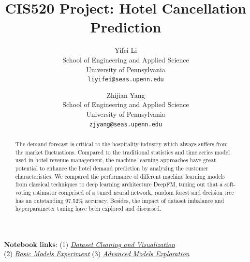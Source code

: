 \documentclass[10pt,twocolumn,letterpaper]{article}
\begin{document}
\title{CIS520 Project: Hotel Cancellation Prediction}
\author{Yifei Li\\
School of Engineering and Applied Science\\
University of Pennsylvania\\
{\tt\small liyifei@seas.upenn.edu}
\and
Zhijian Yang\\
School of Engineering and Applied Science\\
University of Pennsylvania\\
{\tt\small zjyang@seas.upenn.edu}
}

\maketitle

\begin{abstract}
   The demand forecast is critical to the hospitality industry which always suffers from the market fluctuations. Compared to the traditional statistics and time series model used in hotel revenue management, the machine learning approaches have great potential to enhance the hotel demand prediction by analyzing the customer characteristics. We compared the performance of different machine learning models from classical techniques to deep learning architecture DeepFM, tuning out that a soft-voting estimator comprised of a tuned neural network, random forest and decision tree has an outstanding 97.52\% accuracy. Besides, the impact of dataset imbalance and hyperparameter tuning have been explored and discussed.
\end{abstract}


{\small \textbf{Notebook links}: 
    (1) \href{https://github.com/realliyifei/ML-Project-Hotel-Cancellation-Prediction/blob/main/Data_Cleaning_and_Visualization.ipynb}
        {\emph{Dataset Cleaning and Visualization}} \\
    (2) \href{https://github.com/realliyifei/ML-Project-Hotel-Cancellation-Prediction/blob/main/Basic_Models_Experiment.ipynb}
        {\emph{Basic Models Experiment}}
    (3) \href{https://github.com/realliyifei/ML-Project-Hotel-Cancellation-Prediction/blob/main/Advanced_Models_Exploration.ipynb} 
        {\emph{Advanced Models Exploration}} }
\end{document}
